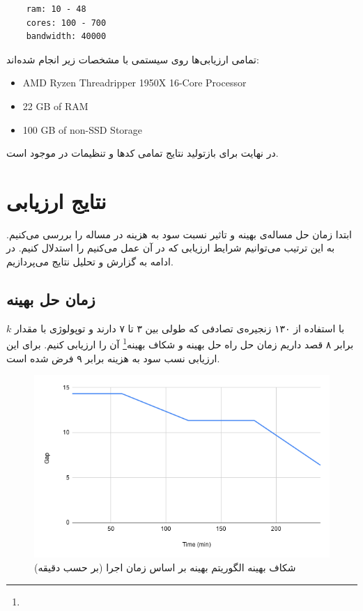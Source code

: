 \begin{latin}
    \begin{verbatim}
    ram: 10 - 48
    cores: 100 - 700
    bandwidth: 40000
    \end{verbatim}
\end{latin}

تمامی ارزیابی‌ها روی سیستمی با مشخصات زیر انجام شده‌اند:

\begin{latin}
    \begin{itemize}
        \item AMD Ryzen Threadripper 1950X 16-Core Processor
        \item 22 GB of RAM
        \item 100 GB of non-SSD Storage
    \end{itemize}
\end{latin}

در نهایت برای بازتولید نتایج تمامی کدها و تنظیمات در \cite{RoadToMSc} موجود است.

\section{نتایج ارزیابی}
ابتدا زمان حل مساله‌ی بهینه و تاثیر نسبت سود به هزینه در مساله را بررسی می‌کنیم.
به این ترتیب می‌توانیم شرایط ارزیابی که در آن عمل می‌کنیم را استدلال کنیم.
در ادامه به گزارش و تحلیل نتایج می‌پردازیم.

\subsection{زمان حل بهینه}
با استفاده از ۱۳۰ زنجیره‌ی تصادفی که طولی بین ۳ تا ۷ دارند
و توپولوژی  با مقدار \(k\) برابر ۸ قصد داریم
زمان حل راه حل بهینه و شکاف بهینه\footnote{} آن را ارزیابی کنیم. برای این ارزیابی نسب سود به هزینه برابر ۹ فرض شده است.


\begin{figure}[h]
\center\includegraphics[scale=.5]{images/chart-5}
\caption{شکاف بهینه الگوریتم بهینه بر اساس زمان اجرا (بر حسب دقیقه)}
\label{fig.10}
\end{figure}


